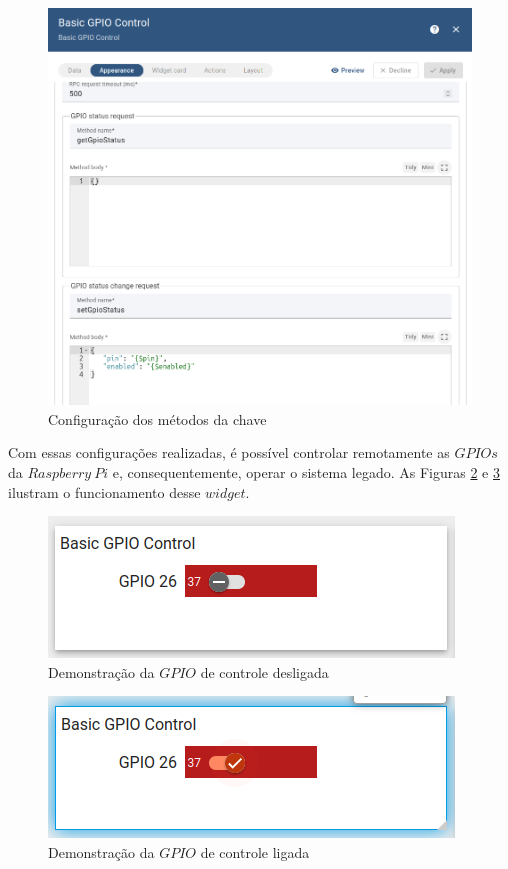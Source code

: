 \documentclass{ecatfg}
\begin{document}
\begin{figure}[!htb]
    \centering
    \includegraphics[scale=0.20]{Figuras/metodos_chave.png}
    \caption{Configuração dos métodos da chave}
    \label{fig:10}
\end{figure}

Com essas configurações realizadas, é possível controlar remotamente as $GPIOs$ da $Raspberry\ Pi$ e, consequentemente, operar o sistema legado. As Figuras \ref{fig:11} e \ref{fig:12} ilustram o funcionamento desse $widget$. \par

\begin{figure}[!htb]
    \centering
    \includegraphics[scale=0.55]{Figuras/chave_desligada.png}
    \caption{Demonstração da $GPIO$ de controle desligada}
    \label{fig:11}
\end{figure}

\begin{figure}[!htb]
    \centering
    \includegraphics[scale=0.55]{Figuras/chave_ligada.png}
    \caption{Demonstração da $GPIO$ de controle ligada}
    \label{fig:12}
\end{figure}
\end{document}
